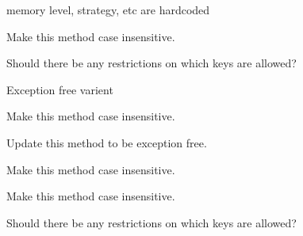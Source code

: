 \begin{DoxyRefList}
\item[\label{todo__todo000011}%
\Hypertarget{todo__todo000011}%
Member \mbox{\hyperlink{classwebsocketpp_1_1extensions_1_1permessage__deflate_1_1enabled_a0d842cb0cd2add8016e739dfcd675ba0}{websocketpp\+:\+:extensions\+:\+:permessage\+\_\+deflate\+:\+:enabled$<$ config $>$\+:\+:init}} (bool is\+\_\+server)]memory level, strategy, etc are hardcoded 
\item[\label{todo__todo000017}%
\Hypertarget{todo__todo000017}%
Member \mbox{\hyperlink{classwebsocketpp_1_1http_1_1parser_1_1parser_abd39762de5ec467a29a537d79602b603}{websocketpp\+:\+:http\+:\+:parser\+:\+:parser\+:\+:append\+\_\+header}} (std\+::string const \&key, std\+::string const \&val)]Make this method case insensitive. 

Should there be any restrictions on which keys are allowed? 

Exception free varient 
\item[\label{todo__todo000016}%
\Hypertarget{todo__todo000016}%
Member \mbox{\hyperlink{classwebsocketpp_1_1http_1_1parser_1_1parser_ae8a8f833c3fb01f1553a26e77f380367}{websocketpp\+:\+:http\+:\+:parser\+:\+:parser\+:\+:get\+\_\+header}} (std\+::string const \&key) const]Make this method case insensitive. 
\item[\label{todo__todo000020}%
\Hypertarget{todo__todo000020}%
Member \mbox{\hyperlink{classwebsocketpp_1_1http_1_1parser_1_1parser_a4dbb443fd916f8b4306e7afdb2e8ff45}{websocketpp\+:\+:http\+:\+:parser\+:\+:parser\+:\+:process\+\_\+header}} (std\+::string\+::iterator begin, std\+::string\+::iterator end)]Update this method to be exception free. 
\item[\label{todo__todo000019}%
\Hypertarget{todo__todo000019}%
Member \mbox{\hyperlink{classwebsocketpp_1_1http_1_1parser_1_1parser_a64ff49a6a1ddbf70b9767874ffdd513e}{websocketpp\+:\+:http\+:\+:parser\+:\+:parser\+:\+:remove\+\_\+header}} (std\+::string const \&key)]Make this method case insensitive. 
\item[\label{todo__todo000018}%
\Hypertarget{todo__todo000018}%
Member \mbox{\hyperlink{classwebsocketpp_1_1http_1_1parser_1_1parser_aba2991b2aa41ca60d9427950502b0b93}{websocketpp\+:\+:http\+:\+:parser\+:\+:parser\+:\+:replace\+\_\+header}} (std\+::string const \&key, std\+::string const \&val)]Make this method case insensitive. 

Should there be any restrictions on which keys are allowed? 


\end{DoxyRefList}
